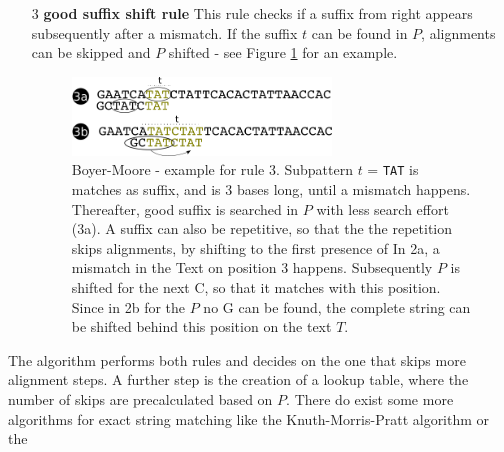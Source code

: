 \begin{itemize}
\item[3] \textbf{good suffix shift rule} This rule checks if a suffix from right appears subsequently after a mismatch. If the suffix $t$ can be found in $P$, alignments can be skipped and $P$ shifted - see Figure \ref{fig:boyer3} for an example.
\begin{figure}[!ht]
\label{fig:boyer3}
    \centering
    \includegraphics[width=0.65\textwidth]{images/boyer3.png}
    \caption[Boyer-Moore - example rule 3]{Boyer-Moore - example for rule 3. Subpattern $t$ = \texttt{TAT} is matches as suffix, and is 3 bases long, until a mismatch happens. Thereafter, good suffix is searched in $P$ with less search effort (3a). A suffix can also be repetitive, so that the the repetition skips alignments, by shifting to the first presence of In 2a, a mismatch in the Text on position 3 happens. Subsequently $P$ is shifted for the next C, so that it matches with this position. Since in 2b for the $P$ no G can be found, the complete string can be shifted behind this position on the text $T$.}
\end{figure}
\end{itemize}
The algorithm performs both rules and decides on the one that skips more alignment steps. A further step is the creation of a lookup table, where the number of skips are precalculated based on $P$. There do exist some more algorithms for exact string matching like the Knuth-Morris-Pratt algorithm or the 
